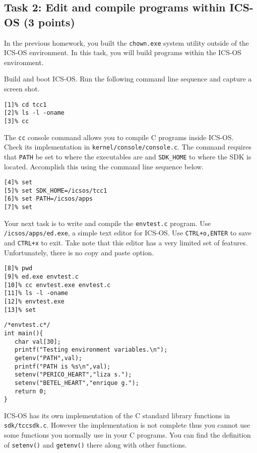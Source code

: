 \documentclass[a4paper, 11pt,oneside]{article}
\begin{document}
\subsection*{Task 2: Edit and compile programs within ICS-OS (3 points)}
In the previous homework, you built the \texttt{chown.exe} system utility outside 
of the ICS-OS environment. In this task, you will build programs within the 
ICS-OS environment.

Build and boot ICS-OS. Run the following command line sequence and capture a screen shot.	

\begin{Verbatim}[frame=single]
[1]% cd tcc1
[2]% ls -l -oname
[3]% cc
\end{Verbatim}

The \texttt{cc} console command allows you to compile C programs inside ICS-OS. Check its implementation 
in \texttt{kernel/console/console.c}. The command requires that \texttt{PATH} be set to where 
the executables are and \texttt{SDK\_HOME} to where the SDK is located. Accomplish this using the command line sequence below.  

\begin{Verbatim}[frame=single]
[4]% set
[5]% set SDK_HOME=/icsos/tcc1
[6]% set PATH=/icsos/apps
[7]% set
\end{Verbatim}

Your next task is to write and compile the \texttt{envtest.c} program. Use \texttt{/icsos/apps/ed.exe}, a simple text editor for ICS-OS. Use \texttt{CTRL+o,ENTER} to save and \texttt{CTRL+x} to exit. Take note that this editor has a very limited set of features. Unfortunately, there is no copy and paste option.

\begin{Verbatim}[frame=single]
[8]% pwd
[9]% ed.exe envtest.c  
[10]% cc envtest.exe envtest.c
[11]% ls -l -oname
[12]% envtest.exe
[13]% set
\end{Verbatim}

\begin{Verbatim}[frame=single]
/*envtest.c*/
int main(){
   char val[30];
   printf("Testing environment variables.\n");
   getenv("PATH",val);
   printf("PATH is %s\n",val);
   setenv("PERICO_HEART","liza s.");
   setenv("BETEL_HEART","enrique g.");
   return 0;
}
\end{Verbatim}

ICS-OS has its own implementation of the C standard library functions in \texttt{sdk/tccsdk.c}.
However the implementation is not complete thus you cannot use some functions you normally 
use in your C programs.
You can find the definition of \texttt{setenv()} and \texttt{getenv()} there along with other functions. 
\end{document}
